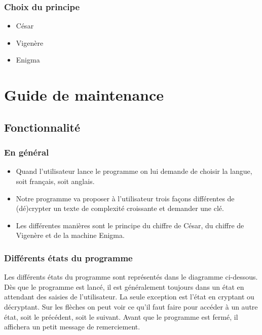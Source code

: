 \documentclass[a4paper,12pt,abstracton,titlepage]{scrartcl}
\begin{document}
\subsubsection{Choix du principe}

\begin{itemize}
\item César
\item Vigenère
\item Enigma

\end{itemize}










\newpage
\section{Guide de maintenance}
\subsection{Fonctionnalité}
\subsubsection{En général}
\begin{itemize}
\item Quand l’utilisateur lance le programme on lui demande de choisir la langue, soit français, soit anglais.
\item Notre programme va proposer à l’utilisateur trois façons différentes de (dé)crypter un texte de complexité croissante et demander une clé.
\item Les différentes manières sont le principe du chiffre de César, du chiffre de Vigenère et de la machine Enigma.
\end{itemize}

\subsubsection{Différents états du programme}
Les différents états du programme sont représentés dans le diagramme ci-dessous. Dès que le programme est lancé, il est généralement toujours dans un état en attendant des saisies de l'utilisateur. La seule exception est l'état en cryptant ou décryptant.
Sur les flèches on peut voir ce qu'il faut faire pour accéder à un autre état, soit le précédent, soit le suivant.
Avant que le programme est fermé, il affichera un petit message de remerciement.\\
\end{document}
